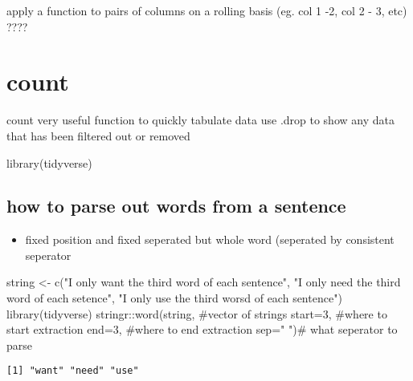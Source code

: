 \documentclass[
  letterpaper,
  DIV=11,
  numbers=noendperiod]{scrreprt}
\newenvironment{Shaded}{\begin{snugshade}}{\end{snugshade}}
\newcommand{\AttributeTok}[1]{\textcolor[rgb]{0.40,0.45,0.13}{#1}}
\newcommand{\CommentTok}[1]{\textcolor[rgb]{0.37,0.37,0.37}{#1}}
\newcommand{\DecValTok}[1]{\textcolor[rgb]{0.68,0.00,0.00}{#1}}
\newcommand{\FunctionTok}[1]{\textcolor[rgb]{0.28,0.35,0.67}{#1}}
\newcommand{\NormalTok}[1]{\textcolor[rgb]{0.00,0.23,0.31}{#1}}
\newcommand{\OtherTok}[1]{\textcolor[rgb]{0.00,0.23,0.31}{#1}}
\newcommand{\SpecialCharTok}[1]{\textcolor[rgb]{0.37,0.37,0.37}{#1}}
\newcommand{\StringTok}[1]{\textcolor[rgb]{0.13,0.47,0.30}{#1}}
\providecommand{\tightlist}{%
  \setlength{\itemsep}{0pt}\setlength{\parskip}{0pt}}\usepackage{longtable,booktabs,array}
\begin{document}
apply a function to pairs of columns on a rolling basis (eg. col 1 -2,
col 2 - 3, etc) ????

\section{count}\label{count}

count very useful function to quickly tabulate data use .drop to show
any data that has been filtered out or removed

\begin{Shaded}
\begin{Highlighting}[]
\FunctionTok{library}\NormalTok{(tidyverse)}
\end{Highlighting}
\end{Shaded}

\subsection{how to parse out words from a
sentence}\label{how-to-parse-out-words-from-a-sentence}

\begin{itemize}
\tightlist
\item
  fixed position and fixed seperated but whole word (seperated by
  consistent seperator
\end{itemize}

\begin{Shaded}
\begin{Highlighting}[]
\NormalTok{string }\OtherTok{\textless{}{-}} \FunctionTok{c}\NormalTok{(}\StringTok{"I only want the third word of each sentence"}\NormalTok{,}
            \StringTok{"I only need the third word of each setence"}\NormalTok{,}
            \StringTok{"I only use the third worsd of each sentence"}\NormalTok{)}
\FunctionTok{library}\NormalTok{(tidyverse)}
\NormalTok{stringr}\SpecialCharTok{::}\FunctionTok{word}\NormalTok{(string, }\CommentTok{\#vector of strings}
              \AttributeTok{start=}\DecValTok{3}\NormalTok{, }\CommentTok{\#where to start extraction}
              \AttributeTok{end=}\DecValTok{3}\NormalTok{, }\CommentTok{\#where to end extraction}
              \AttributeTok{sep=}\StringTok{" "}\NormalTok{)}\CommentTok{\# what seperator to parse}
\end{Highlighting}
\end{Shaded}

\begin{verbatim}
[1] "want" "need" "use" 
\end{verbatim}
\end{document}
